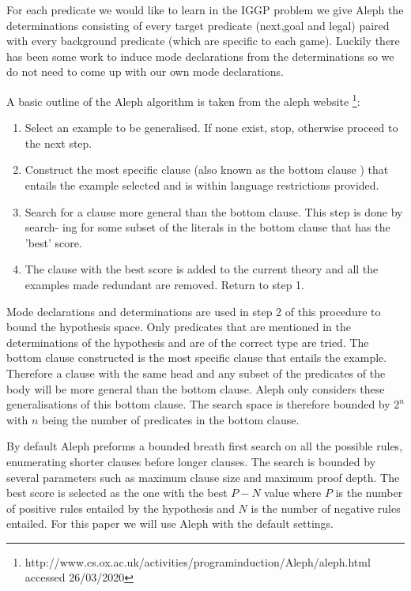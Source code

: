 For each predicate we would like to learn in the IGGP problem we give Aleph the determinations consisting of every target predicate (next,goal and legal) paired with every background predicate (which are specific to each game). Luckily there has been some work to induce mode declarations from the determinations \cite{McCreath/Meta-extraction} so we do not need to come up with our own mode declarations.

A basic outline of the Aleph algorithm is taken from the aleph website \footnote{http://www.cs.ox.ac.uk/activities/programinduction/Aleph/aleph.html accessed 26/03/2020}:
\begin{enumerate}
\item Select an example to be generalised. If none exist, stop, otherwise proceed to the
next step.
\item Construct the most specific clause (also known as the bottom clause \cite{Muggleton/Aleph}) that entails
the example selected and is within language restrictions provided.
\item Search for a clause more general than the bottom clause. This step is done by search-
ing for some subset of the literals in the bottom clause that has the 'best' score.
\item The clause with the best score is added to the current theory and all the examples
made redundant are removed. Return to step 1.
\end{enumerate}

Mode declarations and determinations are used in step 2 of this procedure to bound the hypothesis space. Only predicates that are mentioned in the determinations of the hypothesis and are of the correct type are tried. The bottom clause constructed is the most specific clause that entails the example. Therefore a clause with the same head and any subset of the predicates of the body will be more general than the bottom clause. Aleph only considers these generalisations of this bottom clause. The search space is therefore bounded by $2^n$ with $n$ being the number of predicates in the bottom clause.

By default Aleph preforms a bounded breath first search on all the possible rules, enumerating shorter clauses before longer clauses. The search is bounded by several parameters such as maximum clause size and maximum proof depth. The best score is selected as the one with the best $P - N$ value where $P$ is the number of positive rules entailed by the hypothesis and $N$ is the number of negative rules entailed. For this paper we will use Aleph with the default settings.

